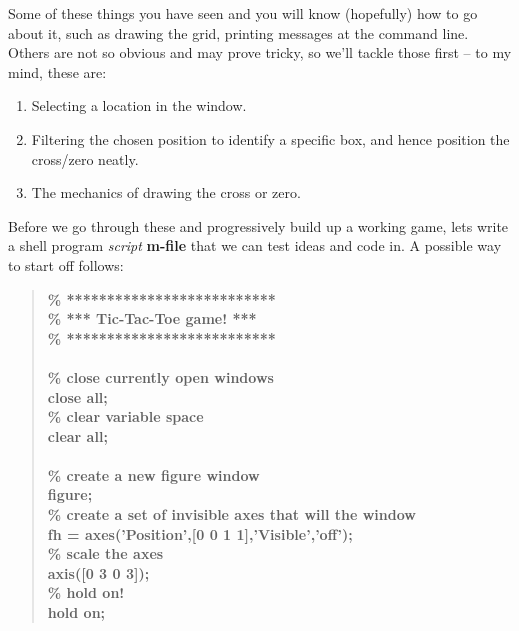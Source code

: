 \documentclass{tufte-book} %
\newenvironment{docspecbold}{\begin{quotation}\ttfamily\bfseries\parskip0pt\parindent0pt\ignorespaces}{\end{quotation}}
\begin{document}
Some of these things you have seen and you will know (hopefully) how to go about it, such as drawing the grid, printing messages at the command line. Others are not so obvious and may prove tricky, so we'll tackle those first -- to my mind, these are:
\begin{enumerate}[noitemsep]
\setlength{\itemindent}{.2in}
\item Selecting a location in the window.
\item Filtering the chosen position to identify a specific box, and hence position the cross/zero neatly.
\item The mechanics of drawing the cross or zero.
\end{enumerate}

Before we go through these and progressively build up a working game, lets write a shell program \textit{script} \textbf{m-file} that we can test ideas and code in. A possible way to start off follows:
\begin{docspecbold}
\textcolor[rgb]{0,0.501961,0}{\% **************************\\
\% *** Tic-Tac-Toe game! ***\\
\% **************************\\}
\ \\
\textcolor[rgb]{0,0.501961,0}{\% close currently open windows\\}
close \textcolor[rgb]{1,0,1}{all};\\
\textcolor[rgb]{0,0.501961,0}{\% clear variable space\\}
clear all;\\
\ \\
\textcolor[rgb]{0,0.501961,0}{\% create a new figure window\\}
figure;\\
\textcolor[rgb]{0,0.501961,0}{\% create a set of invisible axes that will the window\\}
fh = axes(\textcolor[rgb]{1,0,1}{'Position'},[0 0 1 1],\textcolor[rgb]{1,0,1}{'Visible'},\textcolor[rgb]{1,0,1}{'off'});\\
\textcolor[rgb]{0,0.501961,0}{\% scale the axes\\}
axis([0 3 0 3]);\\
\textcolor[rgb]{0,0.501961,0}{\% hold on!\\}
hold \textcolor[rgb]{1,0,1}{on};
\end{docspecbold}
\end{document}
